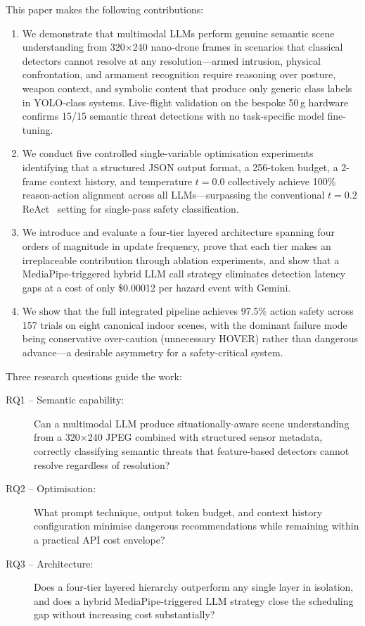 \documentclass[journal]{IEEEtran}
\begin{document}
This paper makes the following contributions:

\begin{enumerate}
  \item We demonstrate that multimodal LLMs perform genuine semantic scene
        understanding from 320$\times$240 nano-drone frames in scenarios that
        classical detectors cannot resolve at any resolution---armed intrusion,
        physical confrontation, and armament recognition require reasoning over
        posture, weapon context, and symbolic content that produce only generic
        class labels in YOLO-class systems.
        Live-flight validation on the bespoke 50\,g hardware confirms 15/15
        semantic threat detections with no task-specific model fine-tuning.
  \item We conduct five controlled single-variable optimisation experiments
        identifying that a structured JSON output format, a 256-token budget,
        a 2-frame context history, and temperature $t=0.0$ collectively
        achieve 100\% reason-action alignment across all LLMs---surpassing
        the conventional $t=0.2$ ReAct~\cite{yao2022react} setting for
        single-pass safety classification.
  \item We introduce and evaluate a four-tier layered architecture spanning
        four orders of magnitude in update frequency, prove that each tier
        makes an irreplaceable contribution through ablation experiments,
        and show that a MediaPipe-triggered hybrid LLM call strategy
        eliminates detection latency gaps at a cost of only \$0.00012 per
        hazard event with Gemini.
  \item We show that the full integrated pipeline achieves 97.5\% action
        safety across 157 trials on eight canonical indoor scenes, with the
        dominant failure mode being conservative over-caution (unnecessary
        HOVER) rather than dangerous advance---a desirable asymmetry for
        a safety-critical system.
\end{enumerate}

Three research questions guide the work:
\begin{description}
  \item[RQ1 -- Semantic capability:] Can a multimodal LLM produce
        situationally-aware scene understanding from a 320$\times$240 JPEG
        combined with structured sensor metadata, correctly classifying
        semantic threats that feature-based detectors cannot resolve regardless
        of resolution?
  \item[RQ2 -- Optimisation:] What prompt technique, output token budget,
        and context history configuration minimise dangerous
        recommendations while remaining within a practical API cost envelope?
  \item[RQ3 -- Architecture:] Does a four-tier layered hierarchy outperform
        any single layer in isolation, and does a hybrid MediaPipe-triggered
        LLM strategy close the scheduling gap without increasing cost
        substantially?
\end{description}
\end{document}
